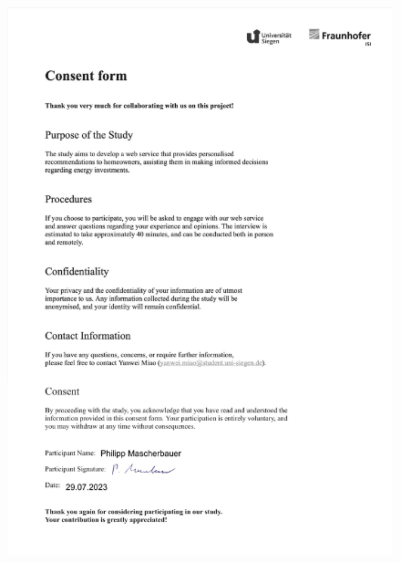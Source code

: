\begin{figure}[h]
    \centering
    \includegraphics[width=\textwidth]{Images/consent_f.jpg}
\end{figure}


